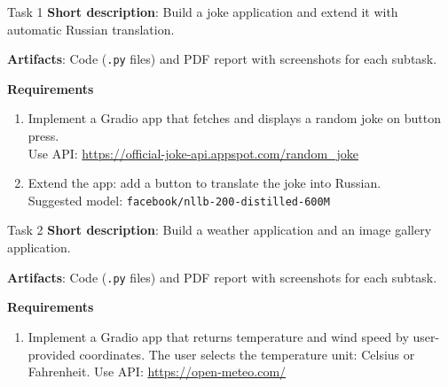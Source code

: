 \documentclass[aspectratio=169]{beamer}
\begin{document}
\begin{frame}[t]{Task 1}
\vspace{-0.3cm}
\textbf{Short description}: Build a joke application and extend it with automatic Russian translation.

\textbf{Artifacts}: Code (\texttt{.py} files) and PDF report with screenshots for each subtask.

\textbf{Requirements}
\footnotesize
\begin{enumerate}
    \item Implement a Gradio app that fetches and displays a random joke on button press.\\
    Use API: \url{https://official-joke-api.appspot.com/random_joke}
    \item Extend the app: add a button to translate the joke into Russian.\\
    Suggested model: \texttt{facebook/nllb-200-distilled-600M}
\end{enumerate}

\end{frame}

\begin{frame}[t]{Task 2}
\vspace{-0.3cm}
\textbf{Short description}: Build a weather application and an image gallery application.

\textbf{Artifacts}: Code (\texttt{.py} files) and PDF report with screenshots for each subtask.

\textbf{Requirements}
\footnotesize
\begin{enumerate}
    \item Implement a Gradio app that returns temperature and wind speed by user-provided coordinates.
    The user selects the temperature unit: Celsius or Fahrenheit.
    Use API: \url{https://open-meteo.com/}
\end{enumerate}

\end{frame}
\end{document}
